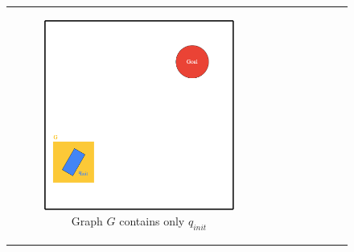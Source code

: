 
\begin{figure}[H]
\begin{center}
\begin{tabular}{c c}

    \begin{subfigure}{0.45\textwidth}
    \includegraphics[width=\linewidth]{chapters/chapter2/img/RRT_step_by_step-A.png}
    \caption{Graph $G$ contains only $q_{init}$ \newline}
    \label{subfig:rrt-step-by-step-A}
    \end{subfigure} &
    \begin{subfigure}{0.45\textwidth}

\end{subfigure}
\end{tabular}
\end{center}
\end{figure}
